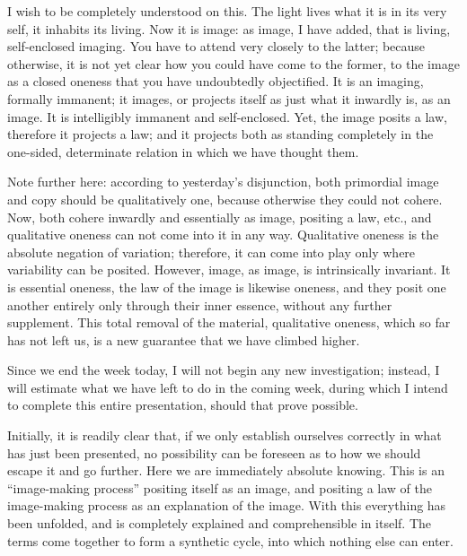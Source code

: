 I wish to be completely understood on this.
The light lives what it is
in its very self,
it inhabits its living.
Now it is image:
as image, I have added,
that is living, self-enclosed imaging.
You have to attend very closely to the latter;
because otherwise, it is not yet clear
how you could have come to the former,
to the image as a closed oneness
that you have undoubtedly objectified.
It is an imaging, formally immanent;
it images, or projects itself as
just what it inwardly is, as an image.
It is intelligibly immanent and self-enclosed.
Yet, the image posits a law,
therefore it projects a law;
and it projects both as
standing completely in
the one-sided, determinate relation
in which we have thought them.

Note further here: according to yesterday's disjunction,
both primordial image and copy should be qualitatively one,
because otherwise they could not cohere.
Now, both cohere inwardly and essentially
as image, positing a law, etc.,
and qualitative oneness can not
come into it in any way.
Qualitative oneness is the absolute negation of variation;
therefore, it can come into play
only where variability can be posited.
However, image, as image, is intrinsically invariant.
It is essential oneness,
the law of the image is likewise oneness,
and they posit one another entirely
only through their inner essence,
without any further supplement.
This total removal of the material, qualitative oneness,
which so far has not left us,
is a new guarantee that we have climbed higher.

Since we end the week today, I will not begin any new investigation;
instead, I will estimate what we have left to do in the coming week,
during which I intend to complete this entire presentation,
should that prove possible.

Initially, it is readily clear that,
if we only establish ourselves correctly in
what has just been presented,
no possibility can be foreseen as to
how we should escape it and go further.
Here we are immediately absolute knowing.
This is an “image-making process”
positing itself as an image,
and positing a law of the image-making process
as an explanation of the image.
With this everything has been unfolded, and
is completely explained and comprehensible in itself.
The terms come together to form a synthetic cycle,
into which nothing else can enter.

